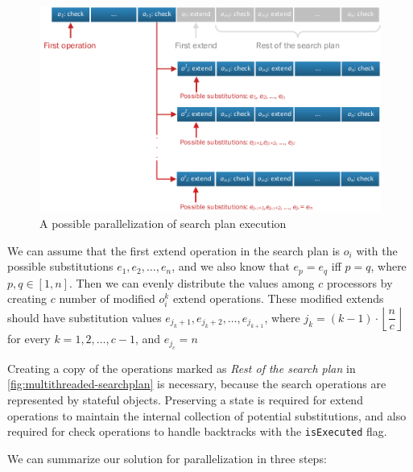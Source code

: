 \begin{figure}[!htp]
	\centering
	\includegraphics[width=\textwidth]{figures/pdfs/parallel_level1.pdf}
	\caption{A possible parallelization of search plan execution}
	\label{fig:multithreaded-searchplan}
\end{figure}

We can assume that the first extend operation in the search plan is $o_i$ with the possible substitutions $e_1, e_2, \ldots, e_n$, and we also know that $e_p = e_q $ iff $p = q$, where $p,q \in [1,n]$. Then we can evenly distribute the values among $c$ processors by creating $c$ number of modified $o^k_i$ extend operations. These modified extends should have substitution values $e_{j_{k}+1}, e_{j_{k}+2}, \ldots, e_{j_{k+1}}$, where $j_k = (k-1) \cdot \left\lfloor\dfrac{n}{c}\right\rfloor $ for every $k = 1, 2, \ldots, c-1$, and $e_{j_{c}} = n$

Creating a copy of the operations marked as \textit{Rest of the search plan} in \autoref{fig:multithreaded-searchplan} is necessary, because the search operations are represented by stateful objects. Preserving a state is required for extend operations to maintain the internal collection of potential substitutions, and also required for check operations to handle backtracks with the \texttt{isExecuted} flag.

We can summarize our solution for parallelization in three steps:

